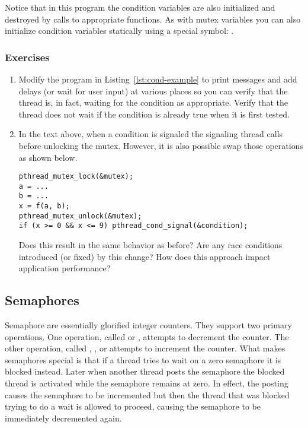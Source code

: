 Notice that in this program the condition variables are also initialized and destroyed by calls
to appropriate functions. As with mutex variables you can also initialize condition variables
statically using a special symbol: .

\subsubsection*{Exercises}

\begin{enumerate}
  
\item Modify the program in Listing~\ref{lst:cond-example} to print messages and add delays (or
  wait for user input) at various places so you can verify that the thread is, in fact, waiting
  for the condition as appropriate. Verify that the thread does not wait if the condition is
  already true when it is first tested.

\item In the text above, when a condition is signaled the signaling thread calls
   before unlocking the mutex. However, it is also possible
  swap those operations as shown below.

\begin{lstlisting}
pthread_mutex_lock(&mutex);
a = ...
b = ...
x = f(a, b);
pthread_mutex_unlock(&mutex);
if (x >= 0 && x <= 9) pthread_cond_signal(&condition);
\end{lstlisting}

Does this result in the same behavior as before? Are any race conditions introduced (or fixed)
by this change? How does this approach impact application performance?

\end{enumerate}

\subsection{Semaphores}
\label{subsec:semaphores}

Semaphore are essentially glorified integer counters. They support two primary operations. One
operation, called  or , attempts to decrement the counter. The other
operation, called , , or  attempts to increment the
counter. What makes semaphores special is that if a thread tries to wait on a zero semaphore it
is blocked instead. Later when another thread posts the semaphore the blocked thread is
activated while the semaphore remains at zero. In effect, the posting causes the semaphore to be
incremented but then the thread that was blocked trying to do a wait is allowed to proceed,
causing the semaphore to be immediately decremented again.

